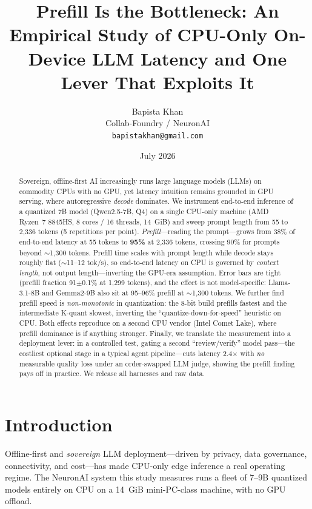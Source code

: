 \documentclass[10pt,twocolumn]{article}
\title{\textbf{Prefill Is the Bottleneck: An Empirical Study of CPU-Only
On-Device LLM Latency and One Lever That Exploits It}}
\author{
  Bapista Khan\\
  Collab-Foundry / NeuronAI\\
  \texttt{bapistakhan@gmail.com}
}
\date{July 2026}
\begin{document}
\maketitle

\begin{abstract}
\noindent
Sovereign, offline-first AI increasingly runs large language models (LLMs)
on commodity CPUs with no GPU, yet latency intuition remains grounded in
GPU serving, where autoregressive \emph{decode} dominates. We instrument
end-to-end inference of a quantized 7B model (Qwen2.5-7B, Q4) on a single
CPU-only machine (AMD Ryzen~7 8845HS, 8 cores / 16 threads, 14~GiB) and
sweep prompt length from 55 to 2{,}336 tokens (5 repetitions per point).
\emph{Prefill}---reading the prompt---grows from 38\% of end-to-end latency
at 55 tokens to \textbf{95\%} at 2{,}336 tokens, crossing 90\% for prompts
beyond $\sim$1{,}300 tokens. Prefill time scales with prompt length while
decode stays roughly flat ($\sim$11--12 tok/s), so end-to-end latency on
CPU is governed by \emph{context length}, not output length---inverting the
GPU-era assumption. Error bars are tight (prefill fraction 91$\pm$0.1\% at
1{,}299 tokens), and the effect is not model-specific: Llama-3.1-8B and
Gemma2-9B also sit at 95--96\% prefill at $\sim$1{,}300 tokens. We further
find prefill speed is \emph{non-monotonic} in quantization: the 8-bit build
prefills fastest and the intermediate K-quant slowest, inverting the
``quantize-down-for-speed'' heuristic on CPU. Both effects reproduce on a
second CPU vendor (Intel Comet Lake), where prefill dominance is if anything
stronger. Finally, we translate the measurement into a deployment lever: in
a controlled test, gating a second ``review/verify'' model pass---the
costliest optional stage in a typical agent pipeline---cuts latency
2.4$\times$ with \emph{no} measurable quality loss under an order-swapped LLM
judge, showing the prefill finding pays off in practice. We release all
harnesses and raw data.
\end{abstract}

\section{Introduction}
\label{sec:intro}

Offline-first and \emph{sovereign} LLM deployment---driven by privacy,
data governance, connectivity, and cost---has made CPU-only edge inference
a real operating regime. The NeuronAI system this study measures runs a
fleet of 7--9B quantized models entirely on CPU on a 14~GiB mini-PC-class
machine, with no GPU offload.
\end{document}
